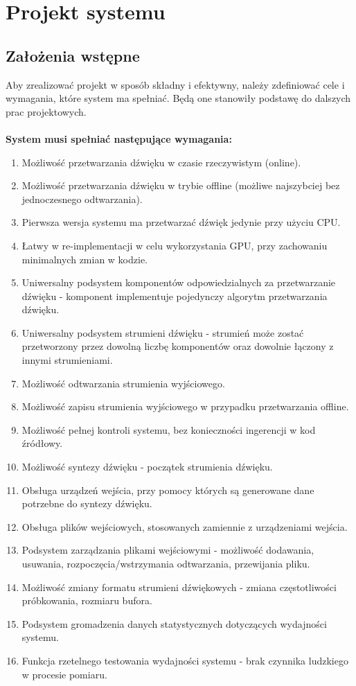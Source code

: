 \chapter{Projekt systemu}
\label{chap:Projekt systemu}

\section{Założenia wstępne}
Aby zrealizować projekt w sposób składny i efektywny, należy zdefiniować cele i wymagania, które system ma spełniać. Będą one stanowiły podstawę do dalszych prac projektowych.
\\\\
\textbf{System musi spełniać następujące wymagania:}
\begin{enumerate}
    \item Możliwość przetwarzania dźwięku w czasie rzeczywistym (online).
    \item Możliwość przetwarzania dźwięku w trybie offline (możliwe najszybciej bez jednoczesnego odtwarzania).
    \item Pierwsza wersja systemu ma przetwarzać dźwięk jedynie przy użyciu CPU.
    \item Łatwy w re-implementacji w celu wykorzystania GPU, przy zachowaniu minimalnych zmian w kodzie.
    \item Uniwersalny podsystem komponentów odpowiedzialnych za przetwarzanie dźwięku - komponent implementuje pojedynczy algorytm przetwarzania dźwięku.
    \item Uniwersalny podsystem strumieni dźwięku - strumień może zostać przetworzony przez dowolną liczbę komponentów oraz dowolnie łączony z innymi strumieniami.
    \item Możliwość odtwarzania strumienia wyjściowego.
    \item Możliwość zapisu strumienia wyjściowego w przypadku przetwarzania offline.
    \item Możliwość pełnej kontroli systemu, bez konieczności ingerencji w kod źródłowy.
    \item Możliwość syntezy dźwięku - początek strumienia dźwięku.
    \item Obsługa urządzeń wejścia, przy pomocy których są generowane dane potrzebne do syntezy dźwięku.
    \item Obsługa plików wejściowych, stosowanych zamiennie z urządzeniami wejścia.
    \item Podsystem zarządzania plikami wejściowymi - możliwość dodawania, usuwania, rozpoczęcia/wstrzymania odtwarzania, przewijania pliku.
    \item Możliwość zmiany formatu strumieni dźwiękowych - zmiana częstotliwości próbkowania, rozmiaru bufora.
    \item Podsystem gromadzenia danych statystycznych dotyczących wydajności systemu.
    \item Funkcja rzetelnego testowania wydajności systemu - brak czynnika ludzkiego w procesie pomiaru.
\end{enumerate}

